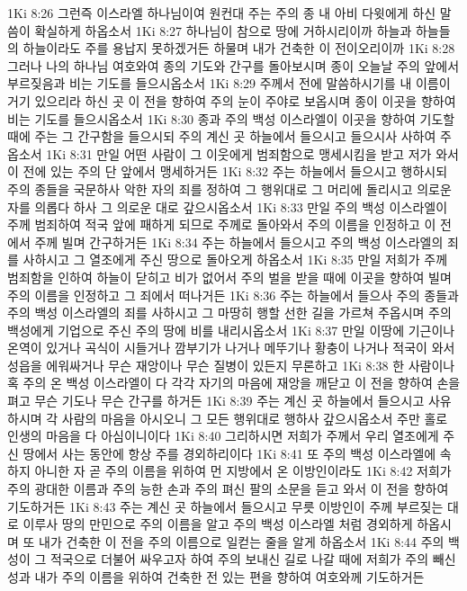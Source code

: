 1Ki 8:26  그런즉 이스라엘 하나님이여 원컨대 주는 주의 종 내 아비 다윗에게 하신 말씀이 확실하게 하옵소서
1Ki 8:27  하나님이 참으로 땅에 거하시리이까 하늘과 하늘들의 하늘이라도 주를 용납지 못하겠거든 하물며 내가 건축한 이 전이오리이까
1Ki 8:28  그러나 나의 하나님 여호와여 종의 기도와 간구를 돌아보시며 종이 오늘날 주의 앞에서 부르짖음과 비는 기도를 들으시옵소서
1Ki 8:29  주께서 전에 말씀하시기를 내 이름이 거기 있으리라 하신 곳 이 전을 향하여 주의 눈이 주야로 보옵시며 종이 이곳을 향하여 비는 기도를 들으시옵소서
1Ki 8:30  종과 주의 백성 이스라엘이 이곳을 향하여 기도할 때에 주는 그 간구함을 들으시되 주의 계신 곳 하늘에서 들으시고 들으시사 사하여 주옵소서
1Ki 8:31  만일 어떤 사람이 그 이웃에게 범죄함으로 맹세시킴을 받고 저가 와서 이 전에 있는 주의 단 앞에서 맹세하거든
1Ki 8:32  주는 하늘에서 들으시고 행하시되 주의 종들을 국문하사 악한 자의 죄를 정하여 그 행위대로 그 머리에 돌리시고 의로운 자를 의롭다 하사 그 의로운 대로 갚으시옵소서
1Ki 8:33  만일 주의 백성 이스라엘이 주께 범죄하여 적국 앞에 패하게 되므로 주께로 돌아와서 주의 이름을 인정하고 이 전에서 주께 빌며 간구하거든
1Ki 8:34  주는 하늘에서 들으시고 주의 백성 이스라엘의 죄를 사하시고 그 열조에게 주신 땅으로 돌아오게 하옵소서
1Ki 8:35  만일 저희가 주께 범죄함을 인하여 하늘이 닫히고 비가 없어서 주의 벌을 받을 때에 이곳을 향하여 빌며 주의 이름을 인정하고 그 죄에서 떠나거든
1Ki 8:36  주는 하늘에서 들으사 주의 종들과 주의 백성 이스라엘의 죄를 사하시고 그 마땅히 행할 선한 길을 가르쳐 주옵시며 주의 백성에게 기업으로 주신 주의 땅에 비를 내리시옵소서
1Ki 8:37  만일 이땅에 기근이나 온역이 있거나 곡식이 시들거나 깜부기가 나거나 메뚜기나 황충이 나거나 적국이 와서 성읍을 에워싸거나 무슨 재앙이나 무슨 질병이 있든지 무론하고
1Ki 8:38  한 사람이나 혹 주의 온 백성 이스라엘이 다 각각 자기의 마음에 재앙을 깨닫고 이 전을 향하여 손을 펴고 무슨 기도나 무슨 간구를 하거든
1Ki 8:39  주는 계신 곳 하늘에서 들으시고 사유하시며 각 사람의 마음을 아시오니 그 모든 행위대로 행하사 갚으시옵소서 주만 홀로 인생의 마음을 다 아심이니이다
1Ki 8:40  그리하시면 저희가 주께서 우리 열조에게 주신 땅에서 사는 동안에 항상 주를 경외하리이다
1Ki 8:41  또 주의 백성 이스라엘에 속하지 아니한 자 곧 주의 이름을 위하여 먼 지방에서 온 이방인이라도
1Ki 8:42  저희가 주의 광대한 이름과 주의 능한 손과 주의 펴신 팔의 소문을 듣고 와서 이 전을 향하여 기도하거든
1Ki 8:43  주는 계신 곳 하늘에서 들으시고 무릇 이방인이 주께 부르짖는 대로 이루사 땅의 만민으로 주의 이름을 알고 주의 백성 이스라엘 처럼 경외하게 하옵시며 또 내가 건축한 이 전을 주의 이름으로 일컫는 줄을 알게 하옵소서
1Ki 8:44  주의 백성이 그 적국으로 더불어 싸우고자 하여 주의 보내신 길로 나갈 때에 저희가 주의 빼신 성과 내가 주의 이름을 위하여 건축한 전 있는 편을 향하여 여호와께 기도하거든

